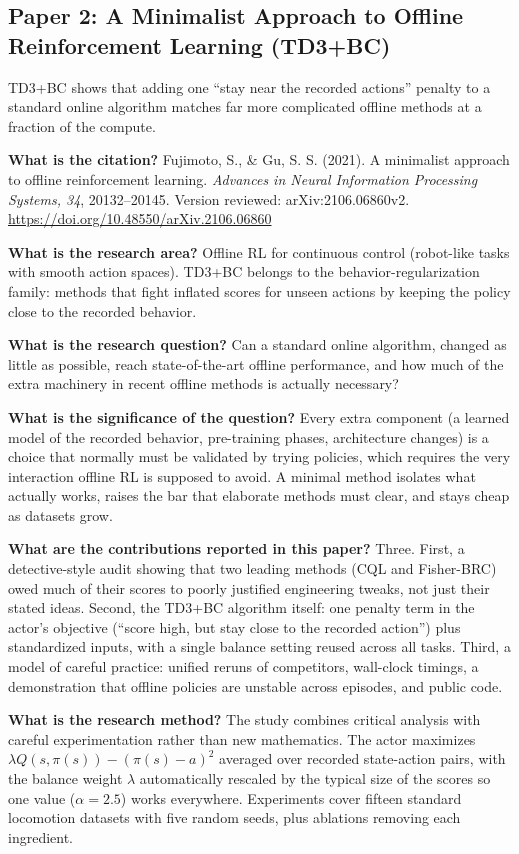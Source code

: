 \documentclass[11pt]{article}
\newcommand{\paper}[1]{\subsection*{#1}}
\newcommand{\q}[2]{\item \textbf{#1} #2}
\begin{document}
\paper{Paper 2: A Minimalist Approach to Offline Reinforcement Learning (TD3+BC)}
TD3+BC shows that adding one ``stay near the recorded actions'' penalty to a standard online algorithm matches far more complicated offline methods at a fraction of the compute.
\begin{qna}

\q{What is the citation?}
Fujimoto, S., \& Gu, S. S. (2021). A minimalist approach to offline reinforcement learning. \emph{Advances in Neural Information Processing Systems, 34}, 20132--20145. Version reviewed: arXiv:2106.06860v2. \url{https://doi.org/10.48550/arXiv.2106.06860}

\q{What is the research area?}
Offline RL for continuous control (robot-like tasks with smooth action spaces). TD3+BC belongs to the behavior-regularization family: methods that fight inflated scores for unseen actions by keeping the policy close to the recorded behavior.

\q{What is the research question?}
Can a standard online algorithm, changed as little as possible, reach state-of-the-art offline performance, and how much of the extra machinery in recent offline methods is actually necessary?

\q{What is the significance of the question?}
Every extra component (a learned model of the recorded behavior, pre-training phases, architecture changes) is a choice that normally must be validated by trying policies, which requires the very interaction offline RL is supposed to avoid. A minimal method isolates what actually works, raises the bar that elaborate methods must clear, and stays cheap as datasets grow.

\q{What are the contributions reported in this paper?}
Three. First, a detective-style audit showing that two leading methods (CQL and Fisher-BRC) owed much of their scores to poorly justified engineering tweaks, not just their stated ideas. Second, the TD3+BC algorithm itself: one penalty term in the actor's objective (``score high, but stay close to the recorded action'') plus standardized inputs, with a single balance setting reused across all tasks. Third, a model of careful practice: unified reruns of competitors, wall-clock timings, a demonstration that offline policies are unstable across episodes, and public code.

\q{What is the research method?}
The study combines critical analysis with careful experimentation rather than new mathematics. The actor maximizes $\lambda Q(s,\pi(s)) - (\pi(s)-a)^2$ averaged over recorded state-action pairs, with the balance weight $\lambda$ automatically rescaled by the typical size of the scores so one value ($\alpha = 2.5$) works everywhere. Experiments cover fifteen standard locomotion datasets with five random seeds, plus ablations removing each ingredient.


\end{qna}
\end{document}
